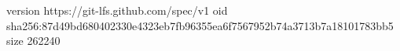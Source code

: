 version https://git-lfs.github.com/spec/v1
oid sha256:87d49bd680402330e4323eb7fb96355ea6f7567952b74a3713b7a18101783bb5
size 262240
